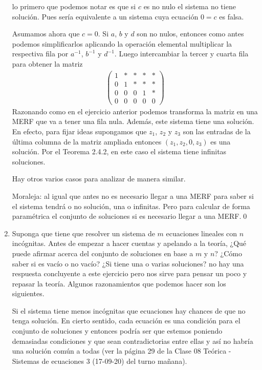\begin{enumerate}[topsep=6pt, itemsep=.4cm]
\rta lo primero que podemos notar es que si $c$ es no nulo el sistema no tiene solución. Pues sería equivalente a un sistema cuya ecuación $0=c$ es falsa.

Asumamos ahora que $c=0$. Si $a$, $b$ y $d$ son no nulos, entonces como antes podemos simplificarlos aplicando la operación elemental multiplicar la respectiva fila por $a^{-1}$, $b^{-1}$ y $d^{-1}$. Luego intercambiar la tercer y cuarta fila para obtener la matriz
\begin{align*}
\left(
\begin{array}{cccc|c}
1 & * & * & * & *\\
0 & 1 & * & * & *\\
0 & 0 & 0 & 1 & *\\
0 & 0 & 0 & 0 & 0
\end{array}
\right)
\end{align*}
Razonando como en el ejercicio anterior podemos transforma la matriz en una MERF que va a tener una fila nula. Además, este sistema tiene una solución. En efecto, para fijar ideas supongamos que $z_1$, $z_2$ y $z_3$ son las entradas de la última columna de la matriz ampliada entonces $(z_1,z_2,0,z_3)$ es una solución. Por el Teorema 2.4.2, en este caso el sistema tiene infinitas soluciones.

Hay otros varios casos para analizar de manera similar. 

Moraleja: al igual que antes no es necesario llegar a una MERF para saber si el sistema tendrá o no solución, una o infinitas. Pero para calcular de forma paramétrica el conjunto de soluciones si es necesario llegar a una MERF.\qed

\item Suponga que tiene que resolver un sistema de $m$ ecuaciones lineales con $n$ incógnitas. Antes de empezar a hacer cuentas y apelando a la teoría, ¿Qué puede afirmar acerca del conjunto de soluciones en base a $m$ y $n$? ¿Cómo saber si es vacío o no vacío? ¿Si tiene una o varias soluciones?
\rta no hay una respuesta concluyente a este ejercicio pero nos sirve para pensar un poco y repasar la teoría. Algunos razonamientos que podemos hacer son los siguientes.

Si el sistema tiene menos incógnitas que ecuaciones hay chances de que no tenga solución. En cierto sentido, cada ecuación es una condición para el conjunto de soluciones y entonces podría ser que estemos poniendo demasiadas condiciones y que sean contradictorias entre ellas y así no habría una solución común a todas (ver la página 29 de la Clase 08 Teórica - Sistemas de ecuaciones 3 (17-09-20) del turno mañana).


\end{enumerate}
